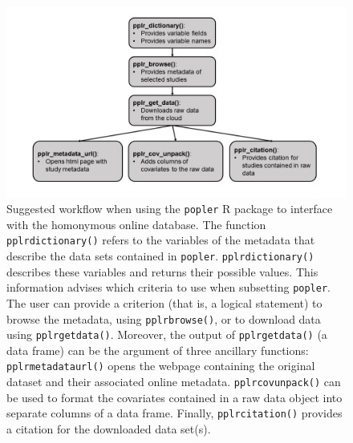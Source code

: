 \documentclass{article}\usepackage[]{graphicx}\usepackage[]{color}
\begin{document}
\newpage
\begin{figure}[h!]
  \begin{center}
    \includegraphics[scale=0.4]{pack_funs}
    \caption{Suggested workflow when using the \texttt{popler} R package to interface with the homonymous online database. The function \texttt{pplr\textunderscore dictionary()} refers to the variables of the metadata that describe the data sets contained in \texttt{popler}. \texttt{pplr\textunderscore dictionary()} describes these variables and returns their possible values. This information advises which criteria to use when subsetting \texttt{popler}. The user can provide a criterion (that is, a logical statement) to browse the metadata, using \texttt{pplr\textunderscore browse()}, or to download data using \texttt{pplr\textunderscore get\textunderscore data()}. Moreover, the output of \texttt{pplr\textunderscore get\textunderscore data()} (a data frame) can be the argument of three ancillary functions: \texttt{pplr\textunderscore metadata\textunderscore url()} opens the webpage containing the original dataset and their associated online metadata. \texttt{pplr\textunderscore cov\textunderscore unpack()} can be used to format the covariates contained in a raw data object into separate columns of a data frame. Finally, \texttt{pplr\textunderscore citation()} provides a citation for the downloaded data set(s).}
    \label{Fig:pack_funs}
  \end{center}
\end{figure}

\end{document}

